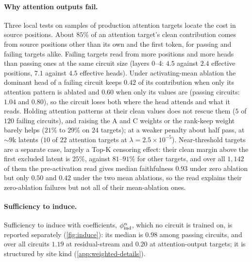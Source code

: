 \documentclass[10pt]{article}
\begin{document}
\paragraph{Why attention outputs fail.}
Three local tests on samples of production attention targets locate the cost in source positions.
About $85\%$ of an attention target's clean contribution comes from source positions other than its own and the first token, for passing and failing targets alike.
Failing targets read from more positions and more heads than passing ones at the same circuit size (layers 0--4: $4.5$ against $2.4$ effective positions, $7.1$ against $4.5$ effective heads).
Under activating-mean ablation the dominant head of a failing circuit keeps $0.42$ of its contribution when only its attention pattern is ablated and $0.60$ when only its values are (passing circuits: $1.04$ and $0.80$), so the circuit loses both where the head attends and what it reads.
Holding attention patterns at their clean values does not rescue them ($5$ of $120$ failing circuits), and raising the A and C weights or the rank-keep weight barely helps ($21\%$ to $29\%$ on $24$ targets); at a weaker penalty about half pass, at ${\sim}9$k latents ($10$ of $22$ attention targets at $\lambda = 2.5 \times 10^{-5}$).
Near-threshold targets are a separate case, largely a Top-K censoring effect: their clean margin above the first excluded latent is $25\%$, against $81$--$91\%$ for other targets, and over all $1{,}142$ of them the pre-activation read gives median faithfulness $0.93$ under zero ablation but only $0.50$ and $0.42$ under the two mean ablations, so the read explains their zero-ablation failures but not all of their mean-ablation ones.

\paragraph{Sufficiency to induce.}
Sufficiency to induce with coefficients, $\phi_{\mathrm{ind}}^{\alpha}$, which no circuit is trained on, is reported separately (\cref{fig:induce}): its median is $0.98$ among passing circuits, and over all circuits $1.19$ at residual-stream and $0.20$ at attention-output targets; it is structured by site kind (\cref{app:weighted-details}).
\end{document}
